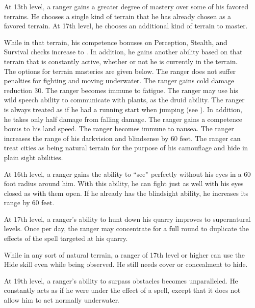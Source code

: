  At 13th level, a ranger gains a greater degree of mastery over some of his favored terrains. He chooses a single kind of terrain that he has already chosen as a favored terrain. At 17th level, he chooses an additional kind of terrain to master.
\par While in that terrain, his competence bonuses on Perception, Stealth, and Survival checks increase to . In addition, he gains another ability based on that terrain that is constantly active, whether or not he is currently in the terrain. The options for terrain masteries are given below.
 The ranger does not suffer penalties for fighting and moving underwater.
 The ranger gains cold damage reduction 30.
 The ranger becomes immune to fatigue.
 The ranger may use his wild speech ability to communicate with plants, as the druid ability.
 The ranger is always treated as if he had a running start when jumping (see ). In addition, he takes only half damage from falling damage.
 The ranger gains a  competence bonus to his land speed.
 The ranger becomes immune to nausea.
 The ranger increases the range of his darkvision and blindsense by 60 feet.
 The ranger can treat cities as being natural terrain for the purpose of his camouflage and hide in plain sight abilities.

 At 16th level, a ranger gains the ability to ``see'' perfectly without his eyes in a 60 foot radius around him. With this ability, he can fight just as well with his eyes closed as with them open. If he already has the blindsight ability, he increases its range by 60 feet.

 At 17th level, a ranger's ability to hunt down his quarry improves to supernatural levels. Once per day, the ranger may concentrate for a full round to duplicate the effects of the  spell targeted at his quarry.

 While in any sort of natural terrain, a ranger of 17th level or higher can use the Hide skill even while being observed. He still needs cover or concealment to hide.

 At 19th level, a ranger's ability to surpass obstacles becomes unparalleled. He constantly acts as if he were under the effect of a  spell, except that it does not allow him to act normally underwater.

